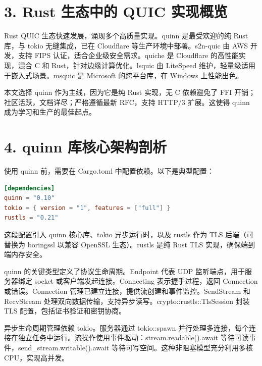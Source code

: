 \chapter{3. Rust 生态中的 QUIC 实现概览}
Rust QUIC 生态快速发展，涌现多个高质量实现。quinn 是最受欢迎的纯 Rust 库，与 tokio 无缝集成，已在 Cloudflare 等生产环境中部署。s2n-quic 由 AWS 开发，支持 FIPS 认证，适合企业级安全需求。quiche 是 Cloudflare 的高性能实现，混合 C 和 Rust，针对边缘计算优化。lsquic 由 LiteSpeed 维护，轻量级适用于嵌入式场景。msquic 是 Microsoft 的跨平台库，在 Windows 上性能出色。\par
本文选择 quinn 作为主线，因为它是纯 Rust 实现，无 C 依赖避免了 FFI 开销；社区活跃，文档详尽；严格遵循最新 RFC，支持 HTTP/3 扩展。这使得 quinn 成为学习和生产的最佳起点。\par
\chapter{4. quinn 库核心架构剖析}
使用 quinn 前，需要在 Cargo.toml 中配置依赖。以下是典型配置：\par
\begin{lstlisting}[language=toml]
[dependencies]
quinn = "0.10"
tokio = { version = "1", features = ["full"] }
rustls = "0.21"
\end{lstlisting}
这段配置引入 quinn 核心库、tokio 异步运行时，以及 rustls 作为 TLS 后端（可替换为 boringssl 以兼容 OpenSSL 生态）。rustls 是纯 Rust TLS 实现，确保端到端内存安全。\par
quinn 的关键类型定义了协议生命周期。Endpoint 代表 UDP 监听端点，用于服务器绑定 socket 或客户端发起连接。Connecting 表示握手过程，返回 Connection 或错误。Connection 管理已建立连接，提供流创建和事件监控。SendStream 和 RecvStream 处理双向数据传输，支持异步读写。crypto::rustls::TlsSession 封装 TLS 配置，包括证书验证和密钥协商。\par
异步生命周期管理依赖 tokio。服务器通过 tokio::spawn 并行处理多连接，每个连接在独立任务中运行。流操作使用事件驱动：stream.readable().await 等待可读事件，send\_{}stream.writable().await 等待可写空间。这种非阻塞模型充分利用多核 CPU，实现高并发。\par
